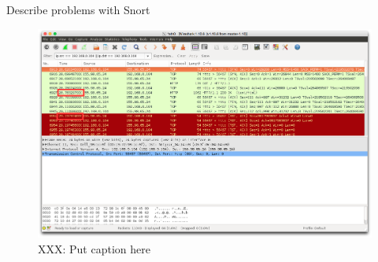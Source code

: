 Describe problems with Snort

\begin{figure}[!t]
    \centering
    \includegraphics[width=\columnwidth]{figures/snort_slow}
    \caption{XXX: Put caption here}
    \label{fig:snort_slow}
\end{figure}
